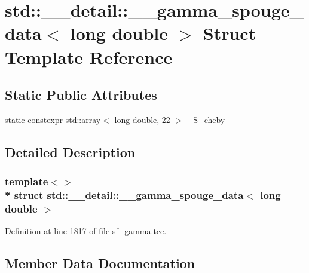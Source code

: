 \hypertarget{structstd_1_1____detail_1_1____gamma__spouge__data_3_01long_01double_01_4}{}\section{std\+:\+:\+\_\+\+\_\+detail\+:\+:\+\_\+\+\_\+gamma\+\_\+spouge\+\_\+data$<$ long double $>$ Struct Template Reference}
\label{structstd_1_1____detail_1_1____gamma__spouge__data_3_01long_01double_01_4}
\subsection*{Static Public Attributes}
\begin{DoxyCompactItemize}
\item 
static constexpr std\+::array$<$ long double, 22 $>$ \hyperlink{structstd_1_1____detail_1_1____gamma__spouge__data_3_01long_01double_01_4_ad1b0c2af63c28d0eaff89430d1b54589}{\+\_\+\+S\+\_\+cheby}
\end{DoxyCompactItemize}


\subsection{Detailed Description}
\subsubsection*{template$<$$>$\\*
struct std\+::\+\_\+\+\_\+detail\+::\+\_\+\+\_\+gamma\+\_\+spouge\+\_\+data$<$ long double $>$}



Definition at line 1817 of file sf\+\_\+gamma.\+tcc.



\subsection{Member Data Documentation}
